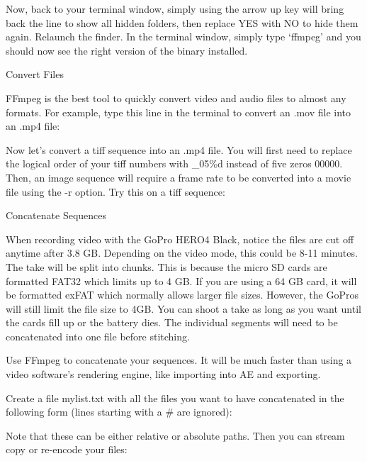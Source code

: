 \begin{fullwidth}
Now, back to your terminal window, simply using the arrow up key will bring back the line to show all hidden folders, then replace YES with NO to hide them again. Relaunch the finder. In the terminal window, simply type ‘ffmpeg’ and you should now see the right version of the binary installed.

{\large Convert Files \par}

FFmpeg is the best tool to quickly convert video and audio files to almost any formats. For example, type this line in the terminal to convert an .mov file into an .mp4 file:


Now let’s convert a tiff sequence into an .mp4 file. You will first need to replace the logical order of your tiff numbers with \_05\%d instead of five zeros 00000. Then, an image sequence will require a frame rate to be converted into a movie file using the -r option. Try this on a tiff sequence:


{\large Concatenate Sequences \par}

When recording video with the GoPro HERO4 Black, notice the files are cut off anytime after 3.8 GB. Depending on the video mode, this could be 8-11 minutes. The take will be split into chunks. This is because the micro SD cards are formatted FAT32 which limits up to 4 GB. If you are using a 64 GB card, it will be formatted exFAT which normally allows larger file sizes. However, the GoPros will still limit the file size to 4GB. You can shoot a take as long as you want until the cards fill up or the battery dies. The individual segments will need to be concatenated into one file before stitching.

Use FFmpeg to concatenate your sequences. It will be much faster than using a video software’s rendering engine, like importing into AE and exporting.

Create a file mylist.txt with all the files you want to have concatenated in the following form (lines starting with a # are ignored):


Note that these can be either relative or absolute paths. Then you can stream copy or re-encode your files:



\end{fullwidth}
